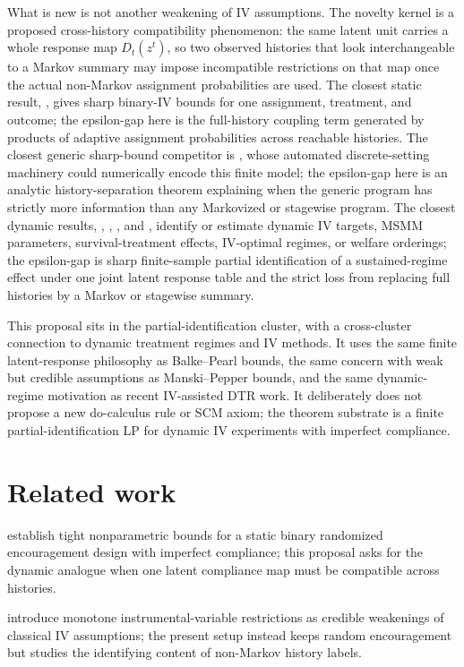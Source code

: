 \documentclass[11pt]{article}
\theoremstyle{definition}
\theoremstyle{plain}
\theoremstyle{remark}
\begin{document}
What is new is not another weakening of IV assumptions.  The novelty kernel is a proposed cross-history compatibility phenomenon: the same latent unit carries a whole response map \(D_t(z^t)\), so two observed histories that look interchangeable to a Markov summary may impose incompatible restrictions on that map once the actual non-Markov assignment probabilities are used.  The closest static result, \citet{BalkePearl1997}, gives sharp binary-IV bounds for one assignment, treatment, and outcome; the epsilon-gap here is the full-history coupling term generated by products of adaptive assignment probabilities across reachable histories.  The closest generic sharp-bound competitor is \citet{DuarteFinkelsteinKnoxMummoloShpitser2024}, whose automated discrete-setting machinery could numerically encode this finite model; the epsilon-gap here is an analytic history-separation theorem explaining when the generic program has strictly more information than any Markovized or stagewise program.  The closest dynamic results, \citet{MichaelCuiLorchTchetgen2024}, \citet{VanDenBergBonevMammen2020}, \citet{ChenZhang2023}, and \citet{Han2024}, identify or estimate dynamic IV targets, MSMM parameters, survival-treatment effects, IV-optimal regimes, or welfare orderings; the epsilon-gap is sharp finite-sample partial identification of a sustained-regime effect under one joint latent response table and the strict loss from replacing full histories by a Markov or stagewise summary.

This proposal sits in the partial-identification cluster, with a cross-cluster connection to dynamic treatment regimes and IV methods.  It uses the same finite latent-response philosophy as Balke--Pearl bounds, the same concern with weak but credible assumptions as Manski--Pepper bounds, and the same dynamic-regime motivation as recent IV-assisted DTR work.  It deliberately does not propose a new do-calculus rule or SCM axiom; the theorem substrate is a finite partial-identification LP for dynamic IV experiments with imperfect compliance.

\section{Related work}
\citet{BalkePearl1997} establish tight nonparametric bounds for a static binary randomized encouragement design with imperfect compliance; this proposal asks for the dynamic analogue when one latent compliance map must be compatible across histories.

\citet{ManskiPepper2000} introduce monotone instrumental-variable restrictions as credible weakenings of classical IV assumptions; the present setup instead keeps random encouragement but studies the identifying content of non-Markov history labels.
\end{document}
